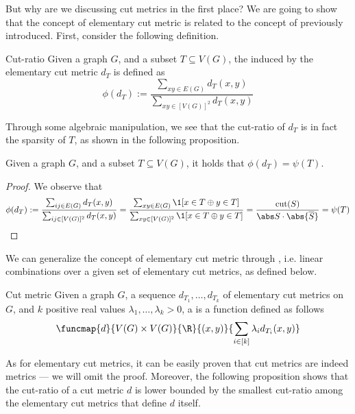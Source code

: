 \documentclass[a4paper, 12pt]{report}
\begin{document}
    But why are we discussing cut metrics in the first place? We are going to show that the concept of elementary cut metric is  related to the concept of  previously introduced. First, consider the following definition.

    \begin{frameddefn}{Cut-ratio}
        Given a graph $G$, and a subset $T \subseteq V(G)$, the  induced by the elementary cut metric $d_T$ is defined as $$\phi(d_T) := \dfrac{\sum_{xy \in E(G)}{d_T(x, y)}}{\sum_{xy \in [V(G)]^2}{d_T(x, y)}}$$
    \end{frameddefn}

    Through some algebraic manipulation, we see that the cut-ratio of $d_T$ is in fact the sparsity of $T$, as shown in the following proposition.

    \begin{framedprop}[label={sparse prop}]{}
        Given a graph $G$, and a subset $T \subseteq V(G)$, it holds that $\phi(d_T) = \psi(T)$.
    \end{framedprop}
    
    \begin{proof}
        We observe that $$\phi(d_T) := \dfrac{\sum_{ij \in E(G)}{d_T(x, y)}}{\sum_{ij \in [V(G)]^2}{d_T(x, y)}} = \dfrac{\sum_{xy \in E(G)}{\1[x \in T \oplus y \in T]}}{\sum_{xy \in [V(G)]^2}{\1[x \in T \oplus y \in T]}} = \dfrac{\mathrm{cut}(S)}{\abs S \cdot \abs{\overline S}} = \psi(T)$$
    \end{proof}

    We can generalize the concept of elementary cut metric through , i.e. linear combinations over a given set of elementary cut metrics, as defined below.

    \begin{frameddefn}{Cut metric}
        Given a graph $G$, a sequence $d_{T_1}, \ldots, d_{T_k}$ of elementary cut metrics on $G$, and $k$ positive real values $\lambda_1, \ldots, \lambda_k > 0$, a  is a function defined as follows $$\funcmap{d}{V(G) \times V(G)}{\R}{(x, y)}{\sum_{i \in [k]}{\lambda_i d_{T_i}(x, y)}}$$
    \end{frameddefn}

    As for elementary cut metrics, it can be easily proven that cut metrics are indeed metrics --- we will omit the proof. Moreover, the following proposition shows that the cut-ratio of a cut metric $d$ is lower bounded by the smallest cut-ratio among the elementary cut metrics that define $d$ itself.
\end{document}
